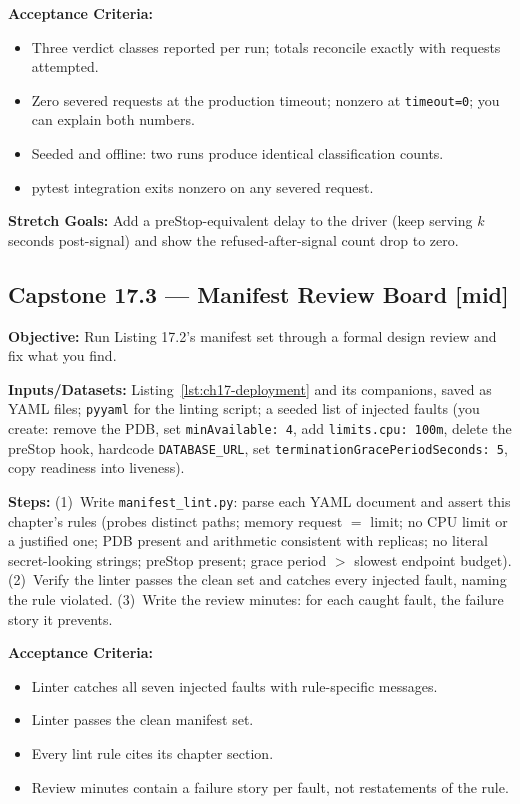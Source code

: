 \textbf{Acceptance Criteria:}
\begin{itemize}
  \item[$\square$] Three verdict classes reported per run; totals
        reconcile exactly with requests attempted.
  \item[$\square$] Zero severed requests at the production timeout;
        nonzero at \texttt{timeout=0}; you can explain both numbers.
  \item[$\square$] Seeded and offline: two runs produce identical
        classification counts.
  \item[$\square$] pytest integration exits nonzero on any severed
        request.
\end{itemize}

\textbf{Stretch Goals:} Add a preStop-equivalent delay to the driver
(keep serving $k$ seconds post-signal) and show the refused-after-signal
count drop to zero.

\subsection*{Capstone 17.3 --- Manifest Review Board \hfill [mid]}
\textbf{Objective:} Run Listing 17.2's manifest set through a formal
design review and fix what you find.

\textbf{Inputs/Datasets:} Listing~\ref{lst:ch17-deployment} and its
companions, saved as YAML files; \texttt{pyyaml} for the linting script;
a seeded list of injected faults (you create: remove the PDB, set
\texttt{minAvailable: 4}, add \texttt{limits.cpu: 100m}, delete the
preStop hook, hardcode \texttt{DATABASE\_URL}, set
\texttt{terminationGracePeriodSeconds: 5}, copy readiness into liveness).

\textbf{Steps:} (1)~Write \texttt{manifest\_lint.py}: parse each YAML
document and assert this chapter's rules (probes distinct paths; memory
request $=$ limit; no CPU limit or a justified one; PDB present and
arithmetic consistent with replicas; no literal secret-looking strings;
preStop present; grace period $>$ slowest endpoint budget).
(2)~Verify the linter passes the clean set and catches every injected
fault, naming the rule violated. (3)~Write the review minutes: for each
caught fault, the failure story it prevents.

\textbf{Acceptance Criteria:}
\begin{itemize}
  \item[$\square$] Linter catches all seven injected faults with
        rule-specific messages.
  \item[$\square$] Linter passes the clean manifest set.
  \item[$\square$] Every lint rule cites its chapter section.
  \item[$\square$] Review minutes contain a failure story per fault, not
        restatements of the rule.
\end{itemize}

